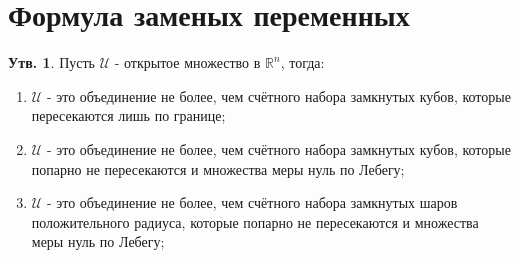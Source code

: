 \documentclass[12pt]{article}
\newcommand{\MR}{\mathbb{R}}
\newcommand{\MU}{\mathcal{U}}
\theoremstyle{definition}
\newtheorem{prop}{Утв.}
\begin{document}
\section*{Формула заменых переменных}
\begin{prop}
	Пусть $\MU$ - открытое множество в $\MR^n$, тогда:
	\begin{enumerate}[label=\arabic*)]
		\item $\MU$ - это объединение не более, чем счётного набора замкнутых кубов, которые пересекаются лишь по границе;
		\item $\MU$ - это объединение не более, чем счётного набора замкнутых кубов, которые попарно не пересекаются и множества меры нуль по Лебегу;
		\item $\MU$ - это объединение не более, чем счётного набора замкнутых шаров положительного радиуса, которые попарно не пересекаются и множества меры нуль по Лебегу;
	\end{enumerate}
\end{prop}
\end{document}
